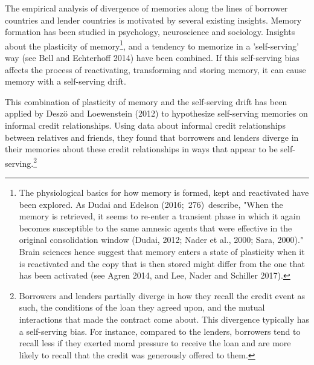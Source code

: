 The empirical analysis of divergence of memories along the lines of borrower
countries and lender countries is motivated by several existing insights.
Memory formation has been studied in psychology, neuroscience and sociology.
Insights about the plasticity of memory\footnote{%
The physiological basics for how memory is formed, kept and reactivated have
been explored. As Dudai and Edelson (2016;\ 276)\ describe, "When the memory
is retrieved, it seems to re-enter a transient phase in which it again
becomes susceptible to the same amnesic agents that were effective in the
original consolidation window (Dudai, 2012; Nader et al., 2000; Sara,
2000)." Brain sciences hence suggest that memory enters a state of
plasticity when it is reactivated and the copy that is then stored might
differ from the one that has been activated (see Agren 2014, and Lee, Nader
and Schiller 2017).}, and a tendency to memorize in a 'self-serving' way
(see Bell and Echterhoff 2014) have been combined. If this self-serving bias
affects the process of reactivating, transforming and storing memory, it can
cause memory with a self-serving drift.

This combination of plasticity of memory and the self-serving drift has been
applied by Desz\"{o} and Loewenstein (2012) to hypothesize self-serving
memories on informal credit relationships. Using data about informal credit
relationships between relatives and friends, they found that borrowers and
lenders diverge in their memories about these credit relationships in
 ways that appear to be self-serving.\footnote{%
Borrowers and lenders partially diverge in how they recall the credit event
as such, the conditions of the loan they agreed upon, and the mutual
interactions that made the contract come about. This divergence typically
has a self-serving bias. For instance, compared to the lenders, borrowers
tend to recall less if they exerted moral pressure to receive the loan and
are more likely to recall that the credit was generously offered to them.}

